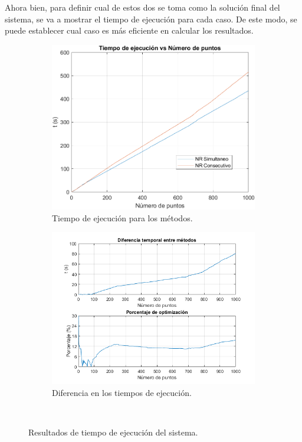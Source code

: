 \documentclass[12pt]{article}
\begin{document}
Ahora bien, para definir cual de estos dos se toma como la solución final del sistema, se va a mostrar el tiempo de ejecución para cada caso. De este modo, se puede establecer cual caso es más eficiente en calcular los resultados.
\begin{figure}[H]
\centering
  \begin{subfigure}[b]{0.49\textwidth}
    \includegraphics[width=7.5 cm, height=7.5 cm, keepaspectratio]{Implementacion/Dif tiempo ejecucion.png}
    \caption{Tiempo de ejecución para los métodos.}
    \label{}
  \end{subfigure}
  \hfill
  \begin{subfigure}[b]{0.49\textwidth}
    \includegraphics[width=8.5 cm, height=8.5 cm, keepaspectratio]{Implementacion/optimizacion tiempo.png}
    \caption{Diferencia en los tiempos de ejecución.}
    \label{}
  \end{subfigure}\\
  \vspace{10pt}
  \caption{Resultados de tiempo de ejecución del sistema.}
  \vspace{-10pt}
\end{figure}
\end{document}

